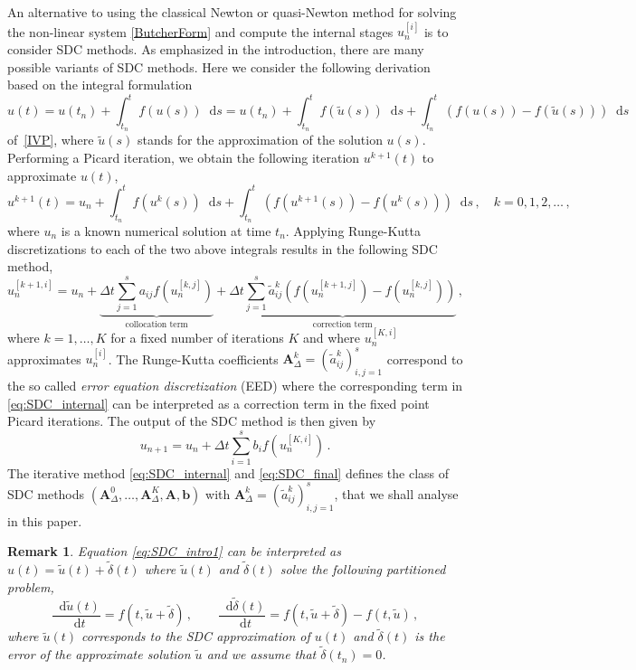\documentclass[sn-mathphys-num]{sn-jnl}%
\newcommand*\diff{\mathop{}\!\mathrm{d}}
\newcommand{\revc}[1]{#1}%
\theoremstyle{thmstyleone}%
\theoremstyle{thmstyletwo}%
\newtheorem{remark}{Remark}%
\theoremstyle{thmstylethree}%
\begin{document}
An alternative to using the classical Newton or quasi-Newton method for solving the non-linear system \eqref{ButcherForm} and compute the internal stages $u^{[i]}_n$ is to consider SDC methods. 
As emphasized in the introduction, there are many possible variants of SDC methods. 
Here we consider the following derivation based on the integral formulation
\begin{equation}
    \label{eq:SDC_intro1}
	u(t) = u(t_n) + \int_{t_n}^t f(u(s)) \diff s = u(t_n) + \int_{t_n}^t {f}(\tilde{u}(s)) \diff s + \int_{t_n}^t ({f}(u(s))-{f}(\tilde{u}(s)))\diff s
\end{equation}
of~\eqref{IVP}, where $\tilde{u}(s)$ stands for the approximation of the solution $u(s)$.
Performing a Picard iteration, we obtain the following iteration $u^{k+1}(t)$ to approximate $u(t)$,
\begin{equation}
    u^{k+1}(t) = u_n + \int_{t_n}^t {f}(u^{k}(s)) \diff s + \int_{t_n}^t (f(u^{k+1}(s))-f(u^{k}(s)))\diff s \,, \quad k = 0, 1, 2, \dots \,,
\end{equation}
where $u_n$ is a known numerical solution at time $t_n$.
Applying Runge-Kutta discretizations to each of the two above integrals results in the following SDC method,
\begin{equation}
    \label{eq:SDC_internal}
    u_n^{[k+1,i]} = u_n + \underbrace{\Delta{t}\sum_{j=1}^{s} a_{ij}f(u_n^{[k,j]})}_{\text{collocation term}} + \underbrace{\Delta{t}\sum_{j=1}^{s} \tilde{a}^k_{ij} (f(u_n^{[k+1,j]}) - f(u_n^{[k,j]}))}_{\text{correction term}} \,,
\end{equation}
where $k = 1, \dots, K$ for a fixed number of iterations $K$ and where $u_n^{[K,i]}$ approximates $u_n^{[i]}$. The Runge-Kutta coefficients $\bm{A}_\Delta^k = (\tilde{a}_{ij}^k)_{i,j=1}^s$ correspond to the so called \emph{error equation discretization} (EED) where the corresponding term in \eqref{eq:SDC_internal} can be interpreted as a correction term in the fixed point Picard iterations. The output of the SDC method is then given by
\begin{equation}
    \label{eq:SDC_final}
    u_{n+1} = u_n + \Delta t \sum_{i=1}^s b_i f(u^{[K,i]}_n) \,.
\end{equation}
The iterative method \eqref{eq:SDC_internal} and \eqref{eq:SDC_final} defines the class of SDC methods $(\bm{A}^0_\Delta, \dots, \bm{A}^K_\Delta, \bm{A}, \bm{b})$ with $\bm{A}^k_\Delta = (\tilde{a}^k_{ij})_{i,j=1}^s$, that we shall analyse in this paper.

\begin{remark}
    \revc{Equation \eqref{eq:SDC_intro1} can be interpreted as $u(t) = \tilde{u}(t) + \tilde{\delta}(t)$ where $\tilde{u}(t)$ and $\tilde{\delta}(t)$ solve the following partitioned problem,
    \begin{equation}
    \frac{\diff\tilde{u}(t)}{\diff t} = f(t, \tilde{u} + \tilde{\delta}) \,, \quad \quad \frac{\diff\tilde{\delta}(t)}{\diff t} = f(t, \tilde{u} + \tilde{\delta}) - f(t, \tilde{u}) \,,
    \end{equation}
where $ \tilde{u}(t)$ corresponds to the SDC approximation of $u(t)$ and $\tilde{\delta}(t)$ is the error of the approximate solution $\tilde{u}$ and we assume that $\tilde{\delta}(t_n) = 0$.}
\end{remark}
\end{document}

